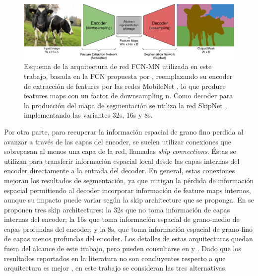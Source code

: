 \documentclass[a4paper,authoryear,review]{elsarticle}
\begin{document}
\begin{figure}
	\centering
	\includegraphics[width=12cm]{figures/Figure1.png}
	\caption{Esquema de la arquitectura de red FCN-MN utilizada en este trabajo, basada en la FCN propuesta por \citet{shelhamer2017fully}, reemplazando su encoder de extracción de features por las redes MobileNet \cite{howard2017mobilenets}, lo que produce features maps con un factor de downsampling n. Como decoder para la producción  del mapa de segmentación se utiliza la red SkipNet \cite{siam2018rtseg}, implementando las variantes 32s, 16s y 8s.}
	\label{fig:FCN-MN}
\end{figure}


Por otra parte, para recuperar la información espacial de grano fino perdida al avanzar a través de las capas del encoder, se suelen utilizar conexiones que sobrepasan al menos una capa de la red, llamadas \emph{skip connections}. Éstas se utilizan para transferir información espacial local desde las capas internas del encoder directamente a la entrada del decoder. En general, estas conexiones mejoran los resultados de segmentación, ya que mitigan la pérdida de información espacial permitiendo al decoder incorporar información de feature maps internos, aunque su impacto puede variar según la skip architecture que se proponga. En \citet{long2015fully} se proponen tres skip architectures: la 32s que no toma información de capas internas del encoder; la 16s que toma información espacial de grano-medio de capas profundas del encoder; y la 8s, que toma información espacial de grano-fino de capas menos profundas del encoder. Los detalles de estas arquitecturas quedan fuera del alcance de este trabajo, pero pueden consultarse en \citet{long2015fully} y \cite{shelhamer2017fully}. Dado que los resultados reportados en la literatura no son concluyentes respecto a que arquitectura es mejor \cite{long2015fully, shelhamer2017fully}, en este trabajo se consideran las tres alternativas.
\end{document}
